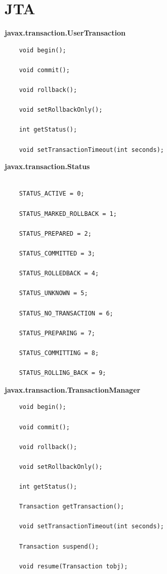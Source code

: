 \documentclass[oneside,
  digital, %
  table,   %
  nolof,     %
  nolot,     %
]{fithesis3}
\begin{document}
\chapter{JTA}
\label{sec:appendix-JTA}

\noindent
\textbf{javax.transaction.UserTransaction}

\begin{verbatim}
    void begin();
    
    void commit();
    
    void rollback();
    
    void setRollbackOnly();
    
    int getStatus();
    
    void setTransactionTimeout(int seconds);
\end{verbatim}

\hfill \break

\noindent
\textbf{javax.transaction.Status}

\begin{verbatim}

    STATUS_ACTIVE = 0;

    STATUS_MARKED_ROLLBACK = 1;

    STATUS_PREPARED = 2;

    STATUS_COMMITTED = 3;

    STATUS_ROLLEDBACK = 4;

    STATUS_UNKNOWN = 5;

    STATUS_NO_TRANSACTION = 6;

    STATUS_PREPARING = 7;

    STATUS_COMMITTING = 8;

    STATUS_ROLLING_BACK = 9;
\end{verbatim}

\noindent
\textbf{javax.transaction.TransactionManager}

\begin{verbatim}
    void begin();
    
    void commit();
    
    void rollback();
    
    void setRollbackOnly();
    
    int getStatus();
    
    Transaction getTransaction();
    
    void setTransactionTimeout(int seconds);
    
    Transaction suspend();
    
    void resume(Transaction tobj);
\end{verbatim}
\end{document}
